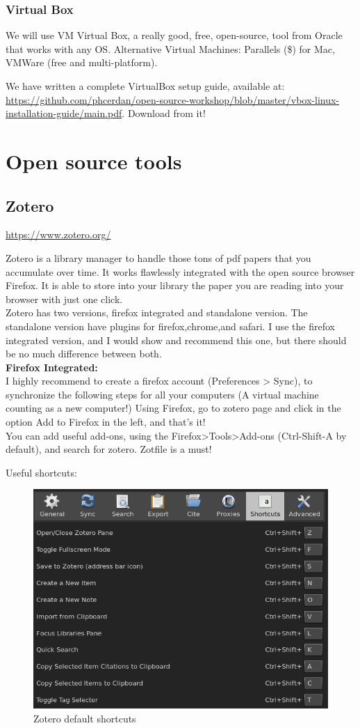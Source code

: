 \documentclass[a4paper]{article}
\begin{document}
\subsubsection{Virtual Box}
We will use VM Virtual Box, a really good, free, open-source, tool from Oracle that works with any OS. Alternative Virtual Machines: Parallels (\$) for Mac, VMWare (free and multi-platform).

We have written a complete VirtualBox setup guide, available at: \url{https://github.com/phcerdan/open-source-workshop/blob/master/vbox-linux-installation-guide/main.pdf}. Download from it!

\section{Open source tools}
\subsection{Zotero}
\url{https://www.zotero.org/}

Zotero is a library manager to handle those tons of pdf papers that you accumulate over time. It works flawlessly integrated with the open source browser Firefox. It is able to store into your library the paper you are reading into your browser with just one click.\\

Zotero has two versions, firefox integrated and standalone version. The standalone version have plugins for firefox,chrome,and safari. I use the firefox integrated version, and I would show and recommend this one, but there should be no much difference between both.\\

\textbf{Firefox Integrated:}\\
I highly recommend to create a firefox account (Preferences > Sync), to synchronize the following steps for all your computers (A virtual machine counting as a new computer!)
Using Firefox, go to zotero page and click in the option Add to Firefox in the left, and that's it!\\
You can add useful add-ons, using the Firefox>Tools>Add-ons (Ctrl-Shift-A by default), and search for zotero. Zotfile is a must!

Useful shortcuts:\\
\begin{figure}[H]
    \centering
    \includegraphics[width=0.5\linewidth]{zotero_shortcuts.png}
    \caption{Zotero default shortcuts}
    \label{fig:zotero_shortcuts}
\end{figure}
\end{document}
